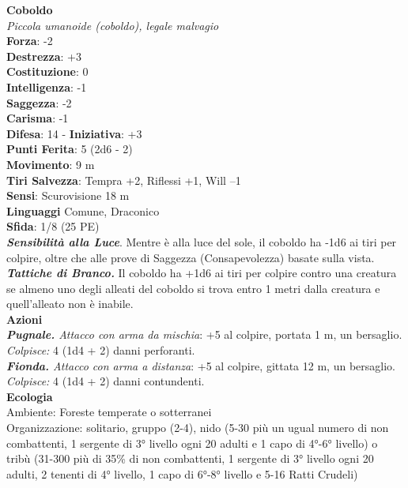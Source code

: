 \begin{multicols}{2}
\medskip\textbf{Coboldo}\\
\emph{Piccola umanoide (coboldo), legale malvagio}\\
\textbf{Forza}: -2\\
\textbf{Destrezza}: +3\\
\textbf{Costituzione}: 0\\
\textbf{Intelligenza}: -1\\
\textbf{Saggezza}: -2\\
\textbf{Carisma}: -1\\
\textbf{Difesa}: 14 - \textbf{Iniziativa}: +3\\
\textbf{Punti Ferita}: 5 (2d6 - 2)\\
\textbf{Movimento}: 9 m\\
\textbf{Tiri Salvezza}: Tempra +2, Riflessi +1, Will –1\\
\textbf{Sensi}: Scurovisione 18 m\\
\textbf{Linguaggi} Comune, Draconico\\
\textbf{Sfida}: 1/8 (25 PE)\smallskip\\
\emph{\textbf{Sensibilità alla Luce}}. Mentre è alla luce del sole, il coboldo ha -1d6 ai tiri per colpire, oltre che alle prove di Saggezza (Consapevolezza) basate sulla vista.\\
\emph{\textbf{Tattiche di Branco.}} Il coboldo ha +1d6 ai tiri per colpire contro una creatura se almeno uno degli alleati del coboldo si trova entro 1 metri dalla creatura e quell'alleato non è inabile. \\
\smallskip\textbf{Azioni}\\
\emph{\textbf{Pugnale.} Attacco con arma da mischia}: +5 al colpire, portata 1 m, un bersaglio.\\
\emph{Colpisce:} 4 (1d4 + 2) danni perforanti.\\
\emph{\textbf{Fionda.} Attacco con arma a distanza}: +5 al colpire, gittata 12 m, un bersaglio.\\
\emph{Colpisce:} 4 (1d4 + 2) danni contundenti.\\
\textbf{Ecologia}\\
Ambiente: Foreste temperate o sotterranei\\
Organizzazione: solitario, gruppo (2-4), nido (5-30 più un ugual numero di non combattenti, 1 sergente di 3° livello ogni 20 adulti e 1 capo di 4°-6° livello) o tribù (31-300 più di 35\% di non combattenti, 1 sergente di 3° livello ogni 20 adulti, 2 tenenti di 4° livello, 1 capo di 6°-8° livello e 5-16 Ratti Crudeli)\\

\end{multicols}
